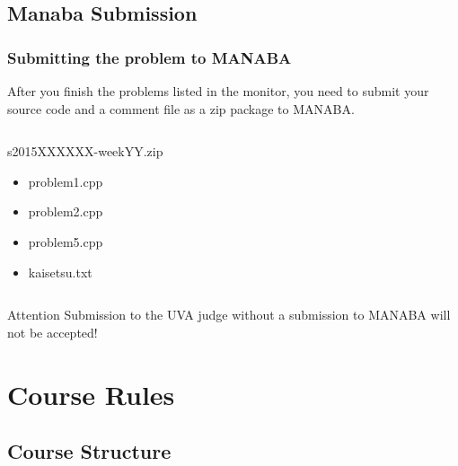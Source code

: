 \documentclass{beamer}
\begin{document}
\subsection{Manaba Submission}
\begin{frame}
  \frametitle{Submitting the problem to MANABA}

  {\small
  After you finish the problems listed in the monitor, you need to
  submit your source code and a comment file as a zip package to MANABA.}

  \medskip

  {\small
  \begin{columns}
    \begin{block}{s2015XXXXXX-weekYY.zip}
      \begin{itemize}
      \item problem1.cpp
      \item problem2.cpp
      \item problem5.cpp
      \item kaisetsu.txt
      \end{itemize}
    \end{block}
  \end{columns}
  }

  \medskip
  
  \begin{alertblock}{Attention}
  Submission to the UVA judge without a submission to MANABA will not
  be accepted!
  \end{alertblock}
\end{frame}

\section{Course Rules}
\subsection{Course Structure}
\end{document}
